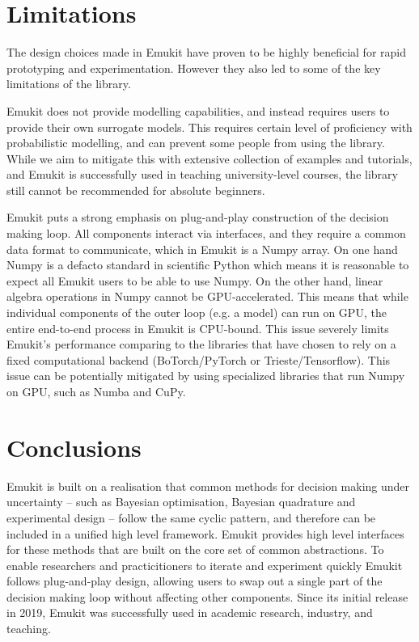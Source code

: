 

\section{Limitations}\label{section:limitations}
The design choices made in Emukit have proven to be highly beneficial for rapid prototyping and experimentation. However they also led to some of the key limitations of the library.

Emukit does not provide modelling capabilities, and instead requires users to provide their own surrogate models. This requires certain level of proficiency with probabilistic modelling, and can prevent some people from using the library. While we aim to mitigate this with extensive collection of examples and tutorials, and Emukit is successfully used in teaching university-level courses, the library still cannot be recommended for absolute beginners.

Emukit puts a strong emphasis on plug-and-play construction of the decision making loop. All components interact via interfaces, and they require a common data format to communicate, which in Emukit is a Numpy array. On one hand Numpy is a defacto standard in scientific Python which means it is reasonable to expect all Emukit users to be able to use Numpy. On the other hand, linear algebra operations in Numpy cannot be GPU-accelerated. This means that while individual components of the outer loop  (e.g. a model) can run on GPU, the entire end-to-end process in Emukit is CPU-bound. This issue severely limits Emukit's performance comparing to the libraries that have chosen to rely on a fixed computational backend (BoTorch/PyTorch or Trieste/Tensorflow). This issue can be potentially mitigated by using specialized libraries that run Numpy on GPU, such as Numba and CuPy.

\section{Conclusions}
Emukit is built on a realisation that common methods for decision making under uncertainty -- such as Bayesian optimisation, Bayesian quadrature and experimental design -- follow the same cyclic pattern, and therefore can be included in a unified high level framework. Emukit provides high level interfaces for these methods that are built on the core set of common abstractions. To enable researchers and practicitioners to iterate and experiment quickly Emukit follows plug-and-play design, allowing users to swap out a single part of the decision making loop without affecting other components. Since its initial release in 2019, Emukit was successfully used in academic research, industry, and teaching.

